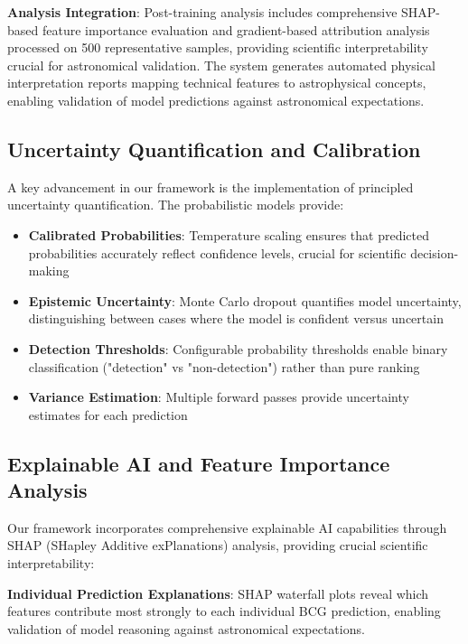 \documentclass[twocolumn,10pt]{aastex631}
\begin{document}
\textbf{Analysis Integration}: Post-training analysis includes comprehensive SHAP-based feature importance evaluation and gradient-based attribution analysis processed on 500 representative samples, providing scientific interpretability crucial for astronomical validation. The system generates automated physical interpretation reports mapping technical features to astrophysical concepts, enabling validation of model predictions against astronomical expectations.

\subsection{Uncertainty Quantification and Calibration}

A key advancement in our framework is the implementation of principled uncertainty quantification. The probabilistic models provide:

\begin{itemize}
\item \textbf{Calibrated Probabilities}: Temperature scaling ensures that predicted probabilities accurately reflect confidence levels, crucial for scientific decision-making
\item \textbf{Epistemic Uncertainty}: Monte Carlo dropout quantifies model uncertainty, distinguishing between cases where the model is confident versus uncertain
\item \textbf{Detection Thresholds}: Configurable probability thresholds enable binary classification ("detection" vs "non-detection") rather than pure ranking
\item \textbf{Variance Estimation}: Multiple forward passes provide uncertainty estimates for each prediction
\end{itemize}

\subsection{Explainable AI and Feature Importance Analysis}

Our framework incorporates comprehensive explainable AI capabilities through SHAP (SHapley Additive exPlanations) analysis, providing crucial scientific interpretability:

\textbf{Individual Prediction Explanations}: SHAP waterfall plots reveal which features contribute most strongly to each individual BCG prediction, enabling validation of model reasoning against astronomical expectations.
\end{document}
